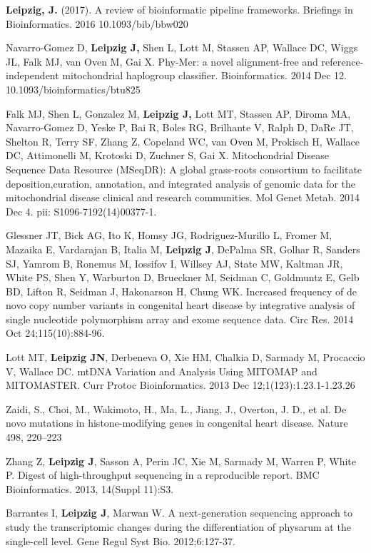 \documentclass{drexelthesis}
\begin{document}
\textbf{Leipzig, J.} (2017). A review of bioinformatic pipeline frameworks. Briefings in Bioinformatics. 2016 10.1093/bib/bbw020

Navarro-Gomez D, \textbf{Leipzig J,} Shen L, Lott M, Stassen AP, Wallace DC, Wiggs JL, Falk MJ, van Oven M, Gai X. Phy-Mer: a novel alignment-free and reference-independent mitochondrial haplogroup classifier. Bioinformatics. 2014 Dec 12. 10.1093/bioinformatics/btu825

Falk MJ, Shen L, Gonzalez M, \textbf{Leipzig J,} Lott MT, Stassen AP, Diroma MA, Navarro-Gomez D, Yeske P, Bai R, Boles RG, Brilhante V, Ralph D, DaRe JT, Shelton R, Terry SF, Zhang Z, Copeland WC, van Oven M, Prokisch H, Wallace DC, Attimonelli M, Krotoski D, Zuchner S, Gai X. Mitochondrial Disease Sequence Data Resource (MSeqDR): A global grass-roots consortium to facilitate deposition,curation, annotation, and integrated analysis of genomic data for the mitochondrial disease clinical and research communities. Mol Genet Metab. 2014 Dec 4. pii: S1096-7192(14)00377-1.

Glessner JT, Bick AG, Ito K, Homsy JG, Rodriguez-Murillo L, Fromer M, Mazaika E, Vardarajan B, Italia M, \textbf{Leipzig J}, DePalma SR, Golhar R, Sanders SJ, Yamrom B, Ronemus M, Iossifov I, Willsey AJ, State MW, Kaltman JR, White PS, Shen Y, Warburton D, Brueckner M, Seidman C, Goldmuntz E, Gelb BD, Lifton R, Seidman J, Hakonarson H, Chung WK. Increased frequency of de novo copy number variants in congenital heart disease by integrative analysis of single nucleotide polymorphism array and exome sequence data. Circ Res. 2014 Oct 24;115(10):884-96.

Lott MT, \textbf{Leipzig JN}, Derbeneva O, Xie HM, Chalkia D, Sarmady M, Procaccio V, Wallace DC. mtDNA Variation and Analysis Using MITOMAP and MITOMASTER. Curr Protoc Bioinformatics. 2013 Dec 12;1(123):1.23.1-1.23.26

Zaidi, S., Choi, M., Wakimoto, H., Ma, L., Jiang, J., Overton, J. D., et al. De novo mutations in histone-modifying genes in congenital heart disease. Nature 498, 220–223

Zhang Z, \textbf{Leipzig J}, Sasson A, Perin JC, Xie M, Sarmady M, Warren P, White P. Digest of high-throughput sequencing in a reproducible report. BMC Bioinformatics. 2013, 14(Suppl 11):S3.

Barrantes I, \textbf{Leipzig J}, Marwan W. A next-generation sequencing approach to study the transcriptomic changes during the differentiation of physarum at the single-cell level. Gene Regul Syst Bio. 2012;6:127-37.
\end{document}
